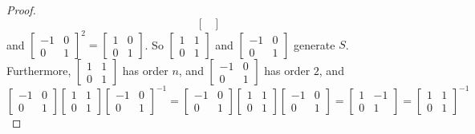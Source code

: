 \documentclass{article}
\theoremstyle{definition}
\newcommand{\inv}[1]{#1^{-1}}
\begin{document}
\begin{proof}
\[\begin{bmatrix}
		\end{bmatrix} \] and $\left[\begin{smallmatrix} -1 & 0 \\ 0 & 1 \end{smallmatrix}\right]^2 = \left[\begin{smallmatrix} 1 & 0 \\ 0 & 1 \end{smallmatrix}\right]$. So $\left[\begin{smallmatrix} 1 & 1 \\ 0 & 1 \end{smallmatrix}\right]$ and $\left[\begin{smallmatrix} -1 & 0 \\ 0 & 1 \end{smallmatrix}\right]$ generate $S$. Furthermore, $\left[\begin{smallmatrix} 1 & 1 \\ 0 & 1 \end{smallmatrix}\right]$ has order $n$, and $\left[\begin{smallmatrix} -1 & 0 \\ 0 & 1 \end{smallmatrix}\right]$ has order $2$, and \[ \left[\begin{matrix} -1 & 0 \\ 0 & 1 \end{matrix}\right] \left[\begin{matrix} 1 & 1 \\ 0 & 1 \end{matrix}\right] \inv{\left[\begin{matrix} -1 & 0 \\ 0 & 1 \end{matrix}\right]} = \left[\begin{matrix} -1 & 0 \\ 0 & 1 \end{matrix}\right] \left[\begin{matrix} 1 & 1 \\ 0 & 1 \end{matrix}\right] \left[\begin{matrix} -1 & 0 \\ 0 & 1 \end{matrix}\right] = \left[\begin{matrix} 1 & -1 \\ 0 & 1 \end{matrix} \right] = \inv{\begin{bmatrix} 1 & 1 \\ 0 & 1 \end{bmatrix}}\]

\end{proof}
\end{document}
